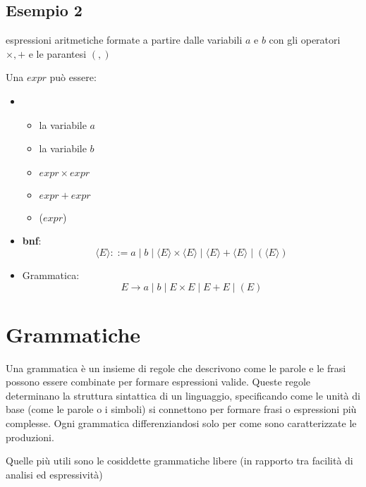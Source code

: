 \subsection{Esempio 2}
espressioni aritmetiche formate a partire dalle variabili $a$ e $b$ con gli operatori $\times, +$ e le parantesi $(,)$

Una $expr$ può essere:
\begin{itemize}
    \item \begin{itemize}
        \item la variabile $a$
        \item la variabile $b$
        \item $expr\times expr$
        \item $expr + expr$
        \item ($expr$)
    \end{itemize}
    \item \textbf{bnf}:
      \[
        \langle E \rangle ::= a\mid b\mid \langle E \rangle\times \langle E \rangle \mid \langle E \rangle + \langle E \rangle\mid (\langle E \rangle)
      \]
    \item Grammatica:
    \[
        E\to a\mid b\mid E\times E\mid E+E\mid (E)    
    \]
\end{itemize}

\section{Grammatiche}
Una grammatica è un insieme di regole che descrivono come le parole e le frasi possono essere combinate per formare espressioni valide. Queste regole determinano la struttura sintattica di un linguaggio, specificando come le unità di base (come le parole o i simboli) si connettono per formare frasi o espressioni più complesse. Ogni grammatica  differenziandosi solo per come sono caratterizzate le produzioni.

Quelle più utili sono le cosiddette grammatiche libere (in rapporto tra facilità di analisi ed espressività) 


